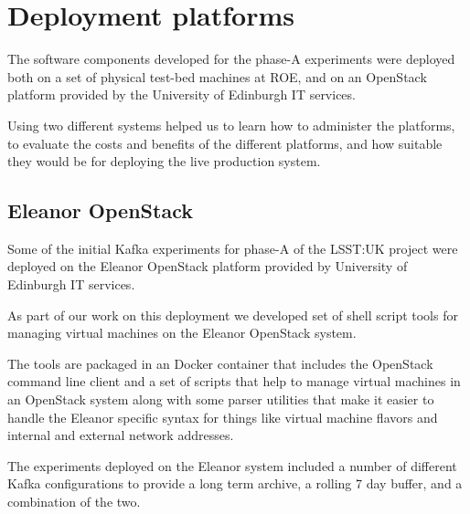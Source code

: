 \documentclass{article}
\newcommand{\docker} {Docker\xspace}
\newcommand{\openstack} {OpenStack\xspace}
\newcommand{\eleanor} {Eleanor\xspace}
\newcommand{\kafka} {Kafka\xspace}
\newcommand{\phasea} {phase-A\xspace}
\newcommand{\lsstuk} {LSST:UK\xspace}
\newcommand{\uedin} {University of Edinburgh\xspace}
\begin{document}
%

\section{Deployment platforms}
\label{deployment-platforms}

The software components developed for the \phasea experiments were deployed both on a set of physical test-bed machines at ROE, and on an \openstack platform provided by the \uedin IT services.

Using two different systems helped us to learn how to administer the platforms, to evaluate the costs and benefits of the different platforms, and how suitable they would be for deploying the live production system.

\subsection{\eleanor \openstack}
\label{deployment-eleanor.openstack}

Some of the initial \kafka experiments for \phasea of the \lsstuk project were deployed on the \eleanor \openstack platform provided by \uedin IT services.

As part of our work on this deployment we developed set of shell script tools for managing virtual machines on the \eleanor \openstack system.

The tools are packaged in an \docker container that includes the \openstack command line client and a set of scripts that help to manage virtual machines in an \openstack system along with some parser utilities that make it easier to handle the \eleanor specific syntax for things like virtual machine flavors and internal and external network addresses.


The experiments deployed on the \eleanor system included a number of different \kafka configurations to provide a long term archive, a rolling 7 day buffer, and a combination of the two.
\end{document}
